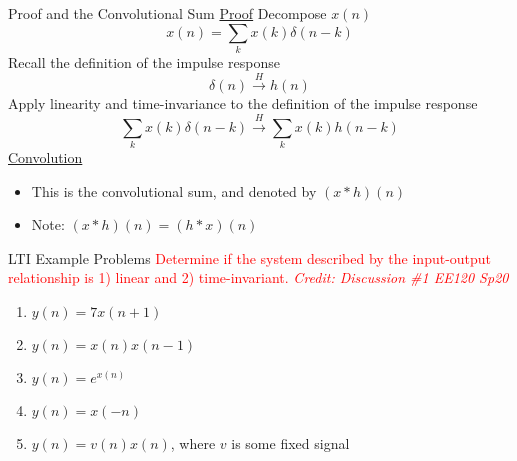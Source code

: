 \begin{frame}{Proof and the Convolutional Sum}
    \underline{Proof}
    Decompose $x(n)$
    \[x(n) = \sum_k x(k)\delta(n-k)\]
    Recall the definition of the impulse response
    \[\delta(n) \overset{H}{\longrightarrow} h(n)\]
    Apply linearity and time-invariance to the definition of the impulse response
    \[\sum_k x(k)\delta(n-k) \overset{H}{\longrightarrow} \sum_k x(k)h(n-k)\]
    \underline{Convolution}
\begin{itemize}
    \item This is the convolutional sum, and denoted by $(x * h)(n)$
    \item Note: $(x * h)(n) = (h * x)(n)$
\end{itemize}
\end{frame}

\begin{frame}{LTI Example Problems}
    \textcolor{red}{Determine if the system described by the input-output relationship is 1) linear and 2) time-invariant. {\footnotesize\textit{Credit: Discussion \#1 EE120 Sp20}}}
    \begin{enumerate}
        \item $y(n) = 7x(n+1)$
        \item $y(n) = x(n)x(n-1)$
        \item $y(n) = e^{x(n)}$
        \item $y(n) = x(-n)$
        \item $y(n) = v(n)x(n)$, where $v$ is some fixed signal
    \end{enumerate}
\end{frame}


